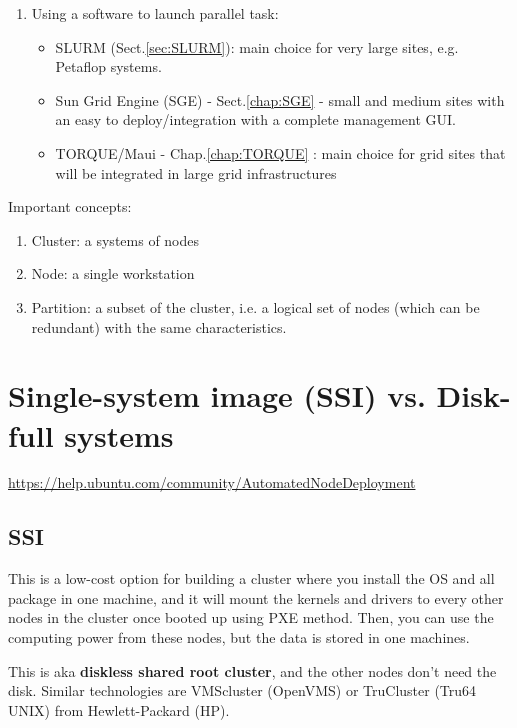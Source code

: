 \begin{enumerate}
  \item Using a software to launch parallel task: 
  
  \begin{itemize}
    \item SLURM (Sect.\ref{sec:SLURM}): main choice for very large sites, e.g.
    Petaflop systems.
    
    
    \item Sun Grid Engine (SGE) - Sect.\ref{chap:SGE} - small and medium sites
    with an easy to deploy/integration with a complete management GUI. 
    
    
    \item TORQUE/Maui - Chap.\ref{chap:TORQUE} : main choice for grid sites that will be integrated
in large grid infrastructures 

  \end{itemize}
\end{enumerate}

Important concepts:
\begin{enumerate}
  \item Cluster: a systems of nodes
  \item Node: a single workstation
  \item Partition: a subset of the cluster, i.e. a logical set of nodes (which
  can be redundant) with the same characteristics. 
\end{enumerate}


\section{Single-system image (SSI) vs. Disk-full systems}


\url{https://help.ubuntu.com/community/AutomatedNodeDeployment}


\subsection{SSI}

This is a low-cost option for building a cluster where you install the OS and
all package in one machine, and it will mount the kernels and drivers to every
other nodes in the cluster once booted up using PXE method. Then, you can use
the computing power from these nodes, but the data is stored in one machines.

This is aka {\bf diskless shared root cluster}, and the other nodes don't need
the disk. Similar technologies are VMScluster (OpenVMS) or TruCluster (Tru64
UNIX) from Hewlett-Packard (HP).

